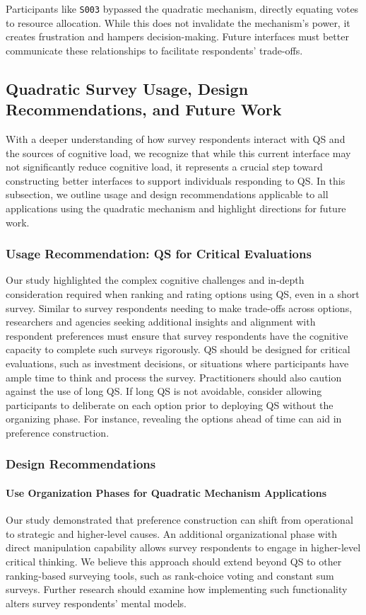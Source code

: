 Participants like \texttt{S003} bypassed the quadratic mechanism, directly equating votes to resource allocation. While this does not invalidate the mechanism’s power, it creates frustration and hampers decision-making. Future interfaces must better communicate these relationships to facilitate respondents’ trade-offs.

\subsection{Quadratic Survey Usage, Design Recommendations, and Future Work}
With a deeper understanding of how survey respondents interact with QS and the sources of cognitive load, we recognize that while this current interface may not significantly reduce cognitive load, it represents a crucial step toward constructing better interfaces to support individuals responding to QS. In this subsection, we outline usage and design recommendations applicable to all applications using the quadratic mechanism and highlight directions for future work.

\subsubsection{Usage Recommendation: QS for Critical Evaluations}
Our study highlighted the complex cognitive challenges and in-depth consideration required when ranking and rating options using QS, even in a short survey. Similar to survey respondents needing to make trade-offs across options, researchers and agencies seeking additional insights and alignment with respondent preferences must ensure that survey respondents have the cognitive capacity to complete such surveys rigorously. QS should be designed for critical evaluations, such as investment decisions, or situations where participants have ample time to think and process the survey. Practitioners should also caution against the use of long QS. If long QS is not avoidable, consider allowing participants to deliberate on each option prior to deploying QS without the organizing phase. For instance, revealing the options ahead of time can aid in preference construction.

\subsubsection{Design Recommendations}
\paragraph{Use Organization Phases for Quadratic Mechanism Applications}
Our study demonstrated that preference construction can shift from operational to strategic and higher-level causes. An additional organizational phase with direct manipulation capability allows survey respondents to engage in higher-level critical thinking. We believe this approach should extend beyond QS to other ranking-based surveying tools, such as rank-choice voting and constant sum surveys. Further research should examine how implementing such functionality alters survey respondents' mental models.

